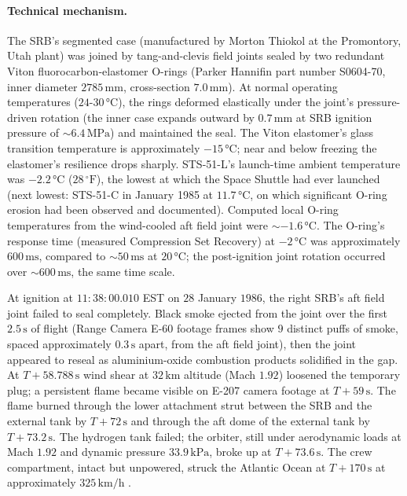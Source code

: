 \paragraph{Technical mechanism.}
The SRB's segmented case (manufactured by Morton Thiokol at the
Promontory, Utah plant) was joined by tang-and-clevis field
joints sealed by two redundant Viton fluorocarbon-elastomer
O-rings (Parker Hannifin part number S0604-70, inner diameter
$2785\,\si{\milli\meter}$, cross-section $7.0\,\si{\milli
\meter}$). At normal operating temperatures
($24$-$30\,\si{\degreeCelsius}$), the rings deformed elastically
under the joint's pressure-driven rotation (the inner case
expands outward by $0.7\,\si{\milli\meter}$ at SRB ignition
pressure of $\sim 6.4\,\si{\mega\pascal}$) and maintained the
seal. The Viton elastomer's glass transition temperature is
approximately $-15\,\si{\degreeCelsius}$; near and below freezing
the elastomer's resilience drops sharply. STS-51-L's launch-time
ambient temperature was $-2.2\,\si{\degreeCelsius}$ ($28\,
{}^{\circ}\mathrm{F}$), the lowest at which the Space Shuttle had
ever launched (next lowest: STS-51-C in January 1985 at
$11.7\,\si{\degreeCelsius}$, on which significant O-ring erosion
had been observed and documented). Computed local O-ring
temperatures from the wind-cooled aft field joint were $\sim
-1.6\,\si{\degreeCelsius}$. The O-ring's response time
(measured Compression Set Recovery) at $-2\,\si{\degreeCelsius}$
was approximately $600\,\si{\milli\second}$, compared to $\sim
50\,\si{\milli\second}$ at $20\,\si{\degreeCelsius}$; the
post-ignition joint rotation occurred over $\sim 600\,\si{
\milli\second}$, the same time scale.

At ignition at $11{:}38{:}00.010$ EST on $28$ January $1986$, the
right SRB's aft field joint failed to seal completely. Black smoke
ejected from the joint over the first $2.5\,\si{\second}$ of
flight (Range Camera E-60 footage frames show $9$ distinct puffs
of smoke, spaced approximately $0.3\,\si{\second}$ apart, from
the aft field joint), then the joint appeared to reseal as
aluminium-oxide combustion products solidified in the gap. At
$T+58.788\,\si{\second}$ wind shear at $32\,\si{\kilo\meter}$
altitude (Mach $1.92$) loosened the temporary plug; a persistent
flame became visible on E-207 camera footage at $T+59\,\si{
\second}$. The flame burned through the lower attachment strut
between the SRB and the external tank by $T+72\,\si{\second}$
and through the aft dome of the external tank by $T+73.2\,\si{
\second}$. The hydrogen tank failed; the orbiter, still under
aerodynamic loads at Mach $1.92$ and dynamic pressure
$33.9\,\si{\kilo\pascal}$, broke up at $T+73.6\,\si{\second}$.
The crew compartment, intact but unpowered, struck the Atlantic
Ocean at $T+170\,\si{\second}$ at approximately $325\,\si{\kilo
\meter\per\hour}$ \cite{acc:nasa-challenger}.

